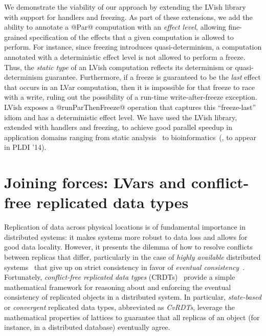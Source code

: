 \documentclass{article}
\begin{document}
We demonstrate the viability of our approach by extending the LVish
library with support for handlers and freezing.  As part of these
extensions, we add the ability to annotate a @Par@ computation with an
\emph{effect level}, allowing fine-grained specification of the
effects that a given computation is allowed to perform.  For instance,
since freezing introduces quasi-determinism, a computation annotated
with a deterministic effect level is not allowed to perform a freeze.
Thus, the \emph{static type} of an LVish computation reflects its
determinism or quasi-determinism guarantee.  Furthermore, if a freeze
is guaranteed to be the \emph{last} effect that occurs in an LVar
computation, then it is impossible for that freeze to race with a
write, ruling out the possibility of a run-time write-after-freeze
exception.  LVish exposes a @runParThenFreeze@ operation that captures
this ``freeze-last'' idiom and has a deterministic effect level.  We
have used the LVish library, extended with handlers and freezing, to
achieve good parallel speedup in application domains ranging from
static analysis~\cite{Freeze-paper} to
bioinformatics~(\cite{effectzoo}, to appear in PLDI '14).

\section{Joining forces: LVars and conflict-free replicated data types}\label{crdts}

Replication of data across physical locations is of fundamental
importance in distributed systems: it makes systems more robust to
data loss and allows for good data locality.  However, it presents the
dilemma of how to resolve conflicts between replicas that differ,
particularly in the case of \emph{highly available} distributed
systems~\cite{dynamo} that give up on strict consistency in favor of
\emph{eventual consistency}~\cite{vogels-ec}.  Fortunately,
\emph{conflict-free replicated data types} (CRDTs)~\cite{crdts,
  crdts-tr} provide a simple mathematical framework for reasoning
about and enforcing the eventual consistency of replicated objects in
a distributed system.  In particular, \emph{state-based} or
\emph{convergent} replicated data types, abbreviated as \emph{CvRDTs},
leverage the mathematical properties of lattices to guarantee that all
replicas of an object (for instance, in a distributed database)
eventually agree.
\end{document}

